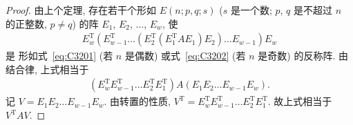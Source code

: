 \begin{proof}
    由上个定理, 存在若干个形如 \(E(n; p, q; s)\)
    (\(s\) 是一个数;
    \(p\), \(q\) 是不超过 \(n\) 的正整数,
    \(p \neq q\))
    的阵
    \(E_1\), \(E_2\), \(\dots\), \(E_w\),
    使
    \begin{align*}
        E_w^{\mathrm{T}}
        (E_{w-1}^{\mathrm{T}}
        \dots
        (E_2^{\mathrm{T}}
        (E_1^{\mathrm{T}}
        A
        E_1)
        E_2)
        \dots
        E_{w-1})
        E_w
    \end{align*}
    是%
    形如式~\eqref{eq:C3201} (若 \(n\) 是偶数)
    或式~\eqref{eq:C3202} (若 \(n\) 是奇数)
    的反称阵.
    由结合律, 上式相当于
    \begin{align*}
        (E_w^{\mathrm{T}}
        E_{w-1}^{\mathrm{T}}
        \dots
        E_2^{\mathrm{T}}
        E_1^{\mathrm{T}})
        A
        (E_1
        E_2
        \dots
        E_{w-1}
        E_w).
    \end{align*}
    记 \(V = E_1 E_2 \dots E_{w-1} E_w\).
    由转置的性质,
    \(V^{\mathrm{T}}
    = E_w^{\mathrm{T}}
    E_{w-1}^{\mathrm{T}}
    \dots
    E_2^{\mathrm{T}}
    E_1^{\mathrm{T}}\).
    故上式相当于 \(V^{\mathrm{T}} A V\).
\end{proof}

